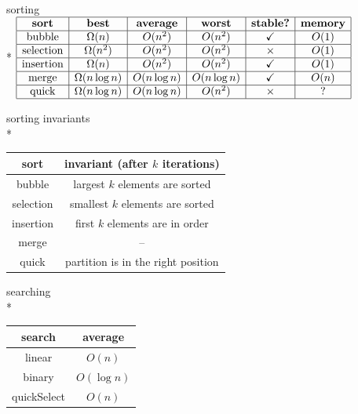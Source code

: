 \documentclass[10pt, landscape]{article}
\begin{document}
\hrulefill \\

\begin{multicols}{3}
    \begin{center}
        sorting
        \\* $
        \begin{array}{| c | c | c | c | c | c |}
            \hline\textbf{sort} & \textbf{best} & \textbf{average} & \textbf{worst} & \textbf{stable?} & \textbf{memory}
    
            \\\hline\text{bubble} & \Omega(n) & O(n^2) & O(n^2) & \checkmark & O(1)
            
            \\\hline\text{selection} & \Omega(n^2) & O(n^2) & O(n^2) & \times & O(1)
            
            \\\hline\text{insertion} & \Omega(n) & O(n^2) & O(n^2) & \checkmark & O(1)
            
            \\\hline\text{merge} & \Omega(n\log n) & O(n\log n) & O(n\log n) & \checkmark & O(n)
            
            \\\hline\text{quick} & \Omega(n\log n) & O(n\log n) & O(n^2) & \times & ?
            \\\hline
        \end{array} 
        $\

        sorting invariants
        \\*
        \begin{tabular}{| c | c |}
            \hline\textbf{sort} & \textbf{invariant} (after $k$ iterations)
            \\\hline bubble & largest $k$ elements are sorted
            \\\hline selection & smallest $k$ elements are sorted
            \\\hline insertion & first $k$ elements are in order
            \\\hline merge & –
            \\\hline quick & partition is in the right position
            \\\hline
        \end{tabular} 
        

        searching
        \\* \begin{tabular}{| c | c |}\hline
            \textbf{search} & \textbf{average} \\\hline
            linear & $O(n)$ \\\hline
            binary & $O(\log n)$ \\\hline
            quickSelect & $O(n)$ \\\hline
        \end{tabular}
        

\end{center}
\end{multicols}
\end{document}
